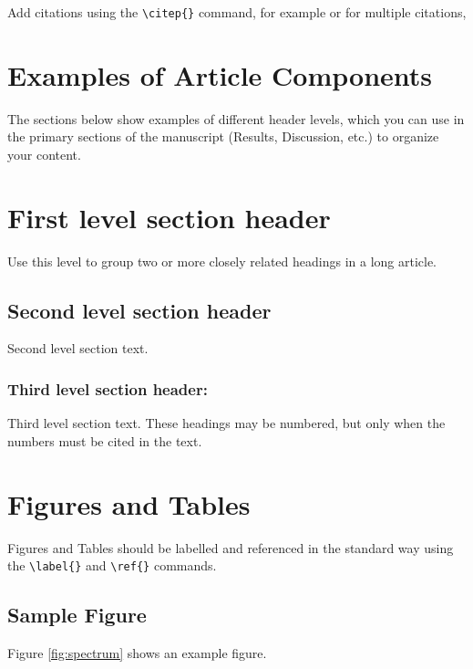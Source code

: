\documentclass[9pt,twocolumn,twoside]{gsajnl}
\begin{document}
Add citations using the \verb|\citep{}| command, for example \citep{neher2013genealogies} or for multiple citations, \citep{neher2013genealogies, rodelsperger2014characterization}

\section*{Examples of Article Components}
\label{sec:examples}

The sections below show examples of different header levels, which you can use in the primary sections of the manuscript (Results, Discussion, etc.) to organize your content.

\section*{First level section header}

Use this level to group two or more closely related headings in a long article.

\subsection*{Second level section header}

Second level section text.

\subsubsection*{Third level section header:}

Third level section text. These headings may be numbered, but only when the numbers must be cited in the text. 

\section*{Figures and Tables}

Figures and Tables should be labelled and referenced in the standard way using the \verb|\label{}| and \verb|\ref{}| commands.

\subsection*{Sample Figure}

Figure \ref{fig:spectrum} shows an example figure.
\end{document}

